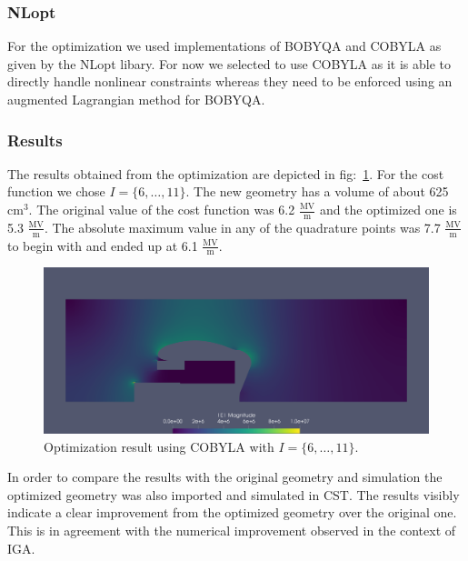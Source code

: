 \subsubsection{NLopt}
For the optimization we used implementations of BOBYQA and COBYLA as given by the NLopt libary. For now we selected to use COBYLA as it is able to directly handle nonlinear constraints whereas they need to be enforced using an augmented Lagrangian method for BOBYQA.

\subsubsection{Results}
The results obtained from the optimization are depicted in fig:~\ref{fig:results_iga}. For the cost function we chose $I=\{ 6, \dotsc, 11 \}$. The new geometry has a volume of about 625 $\mathrm{cm}^3$. The original value of the cost function was 6.2 $\frac{\mathrm{MV}}{\mathrm{m}}$ and the optimized one is 5.3 $\frac{\mathrm{MV}}{\mathrm{m}}$. The absolute maximum value in any of the quadrature points was 7.7 $\frac{\mathrm{MV}}{\mathrm{m}}$ to begin with and ended up at 6.1 $\frac{\mathrm{MV}}{\mathrm{m}}$.

\begin{center}
\begin{figure}[H]
  \includegraphics[width=\textwidth]{figures/200kV/png/cobyla_run11}
  \caption{Optimization result using COBYLA with $I=\{ 6, \dots, 11 \}$.}
  \label{fig:results_iga}
\end{figure}
\end{center}

In order to compare the results with the original geometry and simulation the optimized geometry was also imported and simulated in CST. The results visibly indicate a clear improvement from the optimized geometry over the original one. This is in agreement with the numerical improvement observed in the context of IGA.

